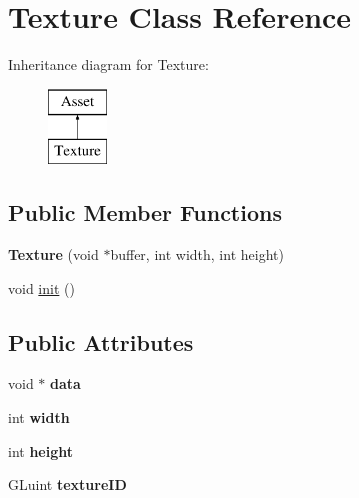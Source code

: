 \hypertarget{class_texture}{}\section{Texture Class Reference}
\label{class_texture}
Inheritance diagram for Texture\+:\begin{figure}[H]
\begin{center}
\leavevmode
\includegraphics[height=2.000000cm]{class_texture}
\end{center}
\end{figure}
\subsection*{Public Member Functions}
\begin{DoxyCompactItemize}
\item 
\hypertarget{class_texture_a7e1972a0d7bd6ef30c544496303a3026}{}{\bfseries Texture} (void $\ast$buffer, int width, int height)\label{class_texture_a7e1972a0d7bd6ef30c544496303a3026}

\item 
void \hyperlink{class_texture_af6d9b9a66df1274c704f23316c840899}{init} ()
\end{DoxyCompactItemize}
\subsection*{Public Attributes}
\begin{DoxyCompactItemize}
\item 
\hypertarget{class_texture_ad20e7dd7c74959ee1bdcc1ede699b268}{}void $\ast$ {\bfseries data}\label{class_texture_ad20e7dd7c74959ee1bdcc1ede699b268}

\item 
\hypertarget{class_texture_a06a0246cb31343557c3441c5733349cd}{}int {\bfseries width}\label{class_texture_a06a0246cb31343557c3441c5733349cd}

\item 
\hypertarget{class_texture_ad37c395c65ff8bde86230908027a6fcd}{}int {\bfseries height}\label{class_texture_ad37c395c65ff8bde86230908027a6fcd}

\item 
\hypertarget{class_texture_ab61a414e1ed356a30c48952d65227691}{}G\+Luint {\bfseries texture\+I\+D}\label{class_texture_ab61a414e1ed356a30c48952d65227691}

\end{DoxyCompactItemize}


